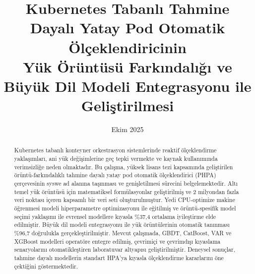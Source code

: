 \documentclass[12pt,a4paper]{article}
\title{Kubernetes Tabanlı Tahmine Dayalı Yatay Pod Otomatik Ölçeklendiricinin\\Yük Örüntüsü Farkındalığı ve Büyük Dil Modeli Entegrasyonu ile Geliştirilmesi}
\author{}
\date{Ekim 2025}
\begin{document}
\maketitle

\begin{abstract}
Kubernetes tabanlı konteyner orkestrasyon sistemlerinde reaktif ölçeklendirme yaklaşımları, ani yük değişimlerine geç tepki vermekte ve kaynak kullanımında verimsizliğe neden olmaktadır. Bu çalışma, yüksek lisans tezi kapsamında geliştirilen örüntü-farkındalıklı tahmine dayalı yatay pod otomatik ölçeklendirici (PHPA) çerçevesinin syswe ad alanına taşınması ve genişletilmesi sürecini belgelemektedir. Altı temel yük örüntüsü için matematiksel formülasyonlar geliştirilmiş ve 2 milyondan fazla veri noktası içeren kapsamlı bir veri seti oluşturulmuştur. Yedi CPU-optimize makine öğrenmesi modeli hiperparametre optimizasyonu ile eğitilmiş ve örüntü-spesifik model seçimi yaklaşımı ile evrensel modellere kıyasla \%37,4 ortalama iyileştirme elde edilmiştir. Büyük dil modeli entegrasyonu ile yük örüntülerinin otomatik tanınması \%96,7 doğrulukla gerçekleştirilmiştir. Mevcut çalışmada, GBDT, CatBoost, VAR ve XGBoost modelleri operatöre entegre edilmiş, çevrimiçi ve çevrimdışı kıyaslama senaryolarını otomatikleştiren laboratuvar altyapısı geliştirilmiştir. Deneysel sonuçlar, tahmine dayalı modellerin standart HPA'ya kıyasla ölçeklendirme kararlarını öne çektiğini göstermektedir.
\end{abstract}


\end{document}
